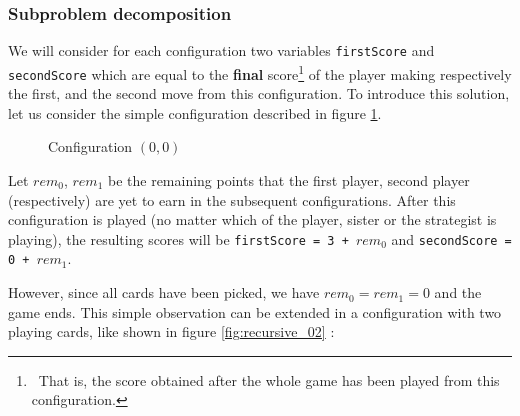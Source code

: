 \documentclass[a4paper,12pt,fleqn]{article}
\newcommand\ezskip{\medskip\noindent}
\begin{document}
\newpage

\subsubsection{Subproblem decomposition} \label{sub:subproblems}
\ezskip
We will consider for each configuration two variables \texttt{firstScore} and \texttt{secondScore} which are equal to the \textbf{final} score\footnote{\ That is, the score obtained after the whole game has been played from this configuration.} of the player making respectively the first, and the second move from this configuration.
To introduce this solution, let us consider the simple configuration described in figure \ref{fig:recursive_01}.

\begin{figure}[H]
    \centering
    \caption{Configuration $(0,0)$}
    \label{fig:recursive_01}
\end{figure}

Let $rem_0$, $rem_1$ be the remaining points that the first player, second player (respectively) are yet to earn in the subsequent configurations.
After this configuration is played (no matter which of the player, sister or the strategist is playing), the resulting scores will be \texttt{firstScore = 3 + $rem_0$} and \texttt{secondScore = 0 + $rem_1$}.

However, since all cards have been picked, we have $rem_0 = rem_1 = 0$ and the game ends. This simple observation can be extended in a configuration with two playing cards, like shown in figure \ref{fig:recursive_02} :
\end{document}
